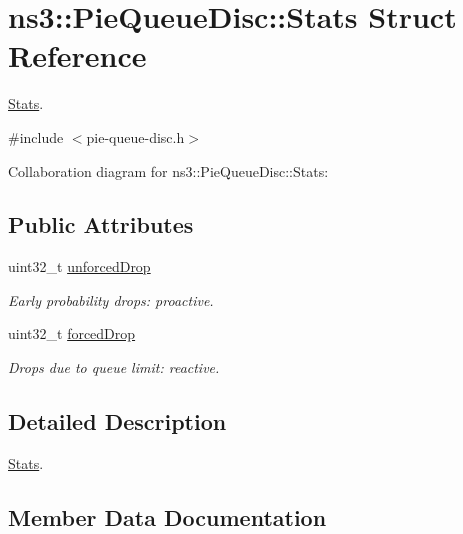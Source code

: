\hypertarget{structns3_1_1PieQueueDisc_1_1Stats}{}\section{ns3\+:\+:Pie\+Queue\+Disc\+:\+:Stats Struct Reference}
\label{structns3_1_1PieQueueDisc_1_1Stats}


\hyperlink{structns3_1_1PieQueueDisc_1_1Stats}{Stats}.  




{\ttfamily \#include $<$pie-\/queue-\/disc.\+h$>$}



Collaboration diagram for ns3\+:\+:Pie\+Queue\+Disc\+:\+:Stats\+:
\subsection*{Public Attributes}
\begin{DoxyCompactItemize}
\item 
uint32\+\_\+t \hyperlink{structns3_1_1PieQueueDisc_1_1Stats_afe4c9f6e4c910cf47d475ff5d29d5bb0}{unforced\+Drop}
\begin{DoxyCompactList}\small\item\em Early probability drops\+: proactive. \end{DoxyCompactList}\item 
uint32\+\_\+t \hyperlink{structns3_1_1PieQueueDisc_1_1Stats_a40eea66d9bc2ce766df9390776eb88a9}{forced\+Drop}
\begin{DoxyCompactList}\small\item\em Drops due to queue limit\+: reactive. \end{DoxyCompactList}\end{DoxyCompactItemize}


\subsection{Detailed Description}
\hyperlink{structns3_1_1PieQueueDisc_1_1Stats}{Stats}. 

\subsection{Member Data Documentation}

